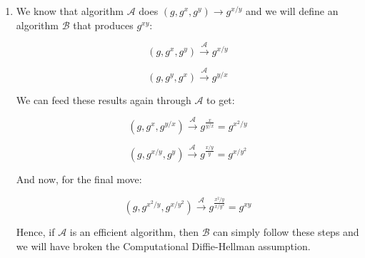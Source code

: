 \documentclass{article}
\begin{document}
\begin{enumerate}
\item %
We know that algorithm $\mathcal{A}$ does $(g, g^x, g^y) \rightarrow g^{x/y}$ and we will define an algorithm $\mathcal{B}$ that produces $g^{xy}$:

$$(g, g^x, g^y) \overset{\mathcal{A}}{\longrightarrow} g^{x/y}$$

$$(g, g^y, g^x) \overset{\mathcal{A}}{\longrightarrow} g^{y/x}$$

We can feed these results again through $\mathcal{A}$ to get:

$$(g, g^x, g^{y/x}) \overset{\mathcal{A}}{\longrightarrow} g^{\frac{x}{y/x}} = g^{x^2 / y}$$

$$(g, g^{x/y}, g^y) \overset{\mathcal{A}}{\longrightarrow} g^{\frac{x/y}{y}} = g^{x / y^2}$$

And now, for the final move:

$$(g, g^{x^2 / y}, g^{x/y^2}) \overset{\mathcal{A}}{\longrightarrow} g^{\frac{x^2 / y}{x / y^2}} = g^{xy}$$

Hence, if $\mathcal{A}$ is an efficient algorithm, then $\mathcal{B}$ can simply follow these steps and we will have broken the Computational Diffie-Hellman assumption.

\end{enumerate}
\end{document}
